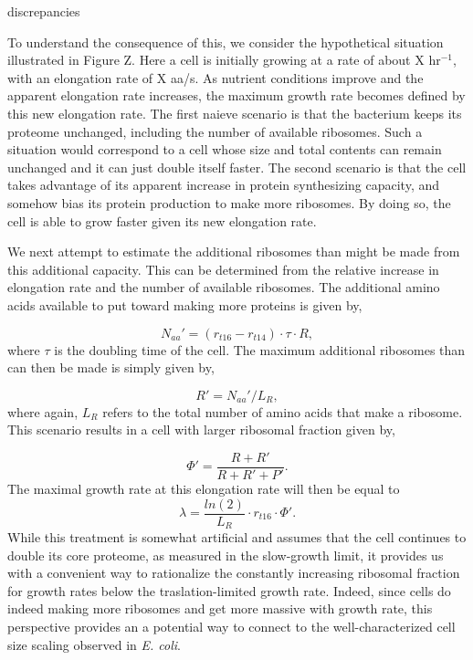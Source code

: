 discrepancies \documentclass[11pt, letterpaper]{article}
\begin{document}
To understand the consequence of this, we consider the hypothetical situation
illustrated in Figure Z. Here a cell is initially growing at a rate of about X
hr$^{-1}$, with an  elongation rate of X aa/s. As nutrient conditions improve
and the apparent elongation rate  increases, the maximum growth rate becomes
defined by this new elongation rate. The first  naieve scenario is that the
bacterium keeps its proteome unchanged, including the  number of available
ribosomes. Such a situation would correspond to a cell whose size  and total
contents can remain unchanged and it can just double itself faster. The  second
scenario is that the cell takes advantage of its apparent increase in protein
synthesizing  capacity, and somehow bias its protein production to make more
ribosomes. By doing so, the cell is able to grow faster given its new elongation
rate.

We next attempt to estimate the additional ribosomes than might be made from
this additional capacity. This can be determined from the relative increase in
elongation rate and the number of available ribosomes. The additional amino
acids available to put toward making more proteins is given by,

\begin{equation}
	N_{aa}' = (r_{t 16} - r_{t 14}) \cdot \tau \cdot R,
\end{equation}
where $\tau$ is the doubling time of the cell. The maximum additional ribosomes
than can then be made is simply given by,

\begin{equation}
 R' = N_{aa}' / L_R,
\end{equation}
where again, $L_R$ refers to the total number of amino acids that make a
ribosome. This scenario results in a cell with larger ribosomal fraction given by,

\begin{equation}
 \Phi' = \frac{R + R'}{ R + R' + P' }.
\end{equation}
The maximal growth rate at this elongation rate will then be equal to
\begin{equation}
 \lambda = \frac{ln(2)}{ L_R} \cdot r_{t 16} \cdot \Phi'.
\end{equation}
While this treatment is somewhat artificial and assumes that the cell continues
to  double its core proteome, as measured in the slow-growth limit, it provides
us with a convenient way to rationalize the constantly increasing ribosomal
fraction for growth rates below the traslation-limited growth rate. Indeed,
since cells do indeed making more ribosomes and get more massive with growth
rate, this perspective provides an a potential way to connect to the
well-characterized cell size scaling observed in {\it E. coli}.
\end{document}
